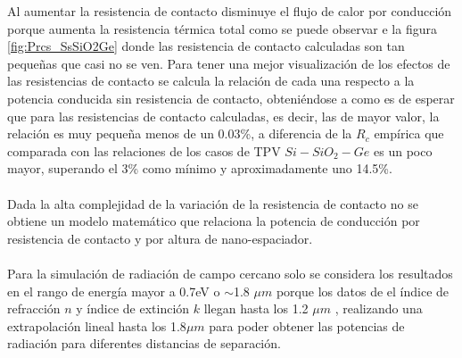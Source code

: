 Al aumentar la resistencia de contacto disminuye el flujo de calor por conducción porque aumenta la resistencia térmica total como se puede observar e la figura \ref{fig:Prcs_SsSiO2Ge} donde las resistencia de contacto calculadas son tan pequeñas que casi no se ven. Para tener una mejor visualización de los efectos de las resistencias de contacto se calcula la relación de cada una respecto a la potencia conducida sin resistencia de contacto, obteniéndose a como es de esperar que para las resistencias de contacto calculadas, es decir, las de mayor valor, la relación es muy pequeña menos de un 0.03\%, a diferencia de la $R_c$ empírica que comparada con las relaciones de los casos de TPV $Si-SiO_2-Ge$ es un poco mayor, superando el 3\% como mínimo y aproximadamente uno 14.5\%.\\\\
Dada la alta complejidad de la variación de la resistencia de contacto no se obtiene un modelo matemático que relaciona la potencia de conducción por resistencia de contacto y por altura de nano-espaciador.\\\\
Para la simulación de radiación de campo cercano solo se considera los resultados en el rango de energía mayor a 0.7eV o $\sim$1.8 $\mu m$ porque los datos de el índice de refracción $n$ y índice de extinción $k$ llegan hasta los 1.2 $\mu m$ \cite{ss_optical_2017}, realizando una extrapolación lineal hasta los 1.8$\mu m$ para poder obtener las potencias de radiación para diferentes distancias de separación.
